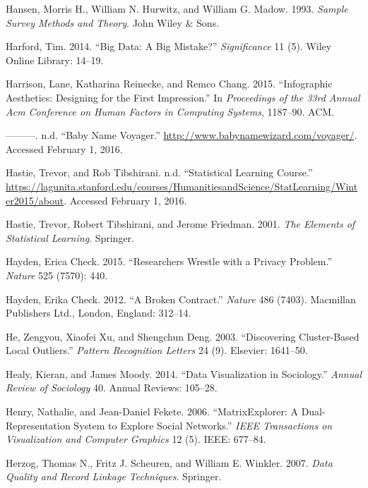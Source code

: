 \documentclass[]{krantz}
\begin{document}
\hypertarget{ref-hansen1993sample}{}
Hansen, Morris H., William N. Hurwitz, and William G. Madow. 1993.
\emph{Sample Survey Methods and Theory}. John Wiley \& Sons.

\hypertarget{ref-harford2014big}{}
Harford, Tim. 2014. ``Big Data: A Big Mistake?'' \emph{Significance} 11
(5). Wiley Online Library: 14--19.

\hypertarget{ref-harrison2015infographic}{}
Harrison, Lane, Katharina Reinecke, and Remco Chang. 2015. ``Infographic
Aesthetics: Designing for the First Impression.'' In \emph{Proceedings
of the 33rd Annual Acm Conference on Human Factors in Computing
Systems}, 1187--90. ACM.

\hypertarget{ref-babynamevoyager}{}
---------. n.d. ``Baby Name Voyager.''
\url{http://www.babynamewizard.com/voyager/}. Accessed February 1, 2016.

\hypertarget{ref-SLcourse}{}
Hastie, Trevor, and Rob Tibshirani. n.d. ``Statistical Learning
Course.''
\url{https://lagunita.stanford.edu/courses/HumanitiesandScience/StatLearning/Winter2015/about}.
Accessed February 1, 2016.

\hypertarget{ref-HastieTibshirani}{}
Hastie, Trevor, Robert Tibshirani, and Jerome Friedman. 2001. \emph{The
Elements of Statistical Learning}. Springer.

\hypertarget{ref-check2015researchers}{}
Hayden, Erica Check. 2015. ``Researchers Wrestle with a Privacy
Problem.'' \emph{Nature} 525 (7570): 440.

\hypertarget{ref-hayden2012broken}{}
Hayden, Erika Check. 2012. ``A Broken Contract.'' \emph{Nature} 486
(7403). Macmillan Publishers Ltd., London, England: 312--14.

\hypertarget{ref-he2003discovering}{}
He, Zengyou, Xiaofei Xu, and Shengchun Deng. 2003. ``Discovering
Cluster-Based Local Outliers.'' \emph{Pattern Recognition Letters} 24
(9). Elsevier: 1641--50.

\hypertarget{ref-healy2014data}{}
Healy, Kieran, and James Moody. 2014. ``Data Visualization in
Sociology.'' \emph{Annual Review of Sociology} 40. Annual Reviews:
105--28.

\hypertarget{ref-henry2006matrixexplorer}{}
Henry, Nathalie, and Jean-Daniel Fekete. 2006. ``MatrixExplorer: A
Dual-Representation System to Explore Social Networks.'' \emph{IEEE
Transactions on Visualization and Computer Graphics} 12 (5). IEEE:
677--84.

\hypertarget{ref-herzog2007data}{}
Herzog, Thomas N., Fritz J. Scheuren, and William E. Winkler. 2007.
\emph{Data Quality and Record Linkage Techniques}. Springer.
\end{document}
